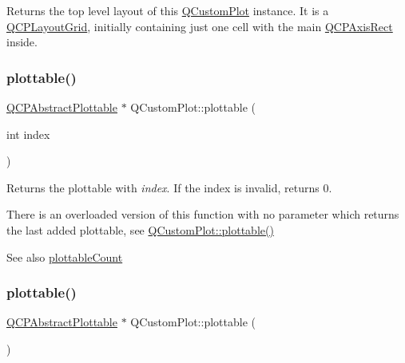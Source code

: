 Returns the top level layout of this \hyperlink{class_q_custom_plot}{Q\+Custom\+Plot} instance. It is a \hyperlink{class_q_c_p_layout_grid}{Q\+C\+P\+Layout\+Grid}, initially containing just one cell with the main \hyperlink{class_q_c_p_axis_rect}{Q\+C\+P\+Axis\+Rect} inside. \mbox{\label{class_q_custom_plot_a32de81ff53e263e785b83b52ecd99d6f}} 
\subsubsection{\texorpdfstring{plottable()}{plottable()}\hspace{0.1cm}{\footnotesize\ttfamily [1/2]}}
{\footnotesize\ttfamily \hyperlink{class_q_c_p_abstract_plottable}{Q\+C\+P\+Abstract\+Plottable} $\ast$ Q\+Custom\+Plot\+::plottable (\begin{DoxyParamCaption}\item[{int}]{index }\end{DoxyParamCaption})}

Returns the plottable with {\itshape index}. If the index is invalid, returns 0.

There is an overloaded version of this function with no parameter which returns the last added plottable, see \hyperlink{class_q_custom_plot_adea38bdc660da9412ba69fb939031567}{Q\+Custom\+Plot\+::plottable()}

\begin{DoxySeeAlso}{See also}
\hyperlink{class_q_custom_plot_a5f4f15991c14bf9ad659bb2a19dfbed4}{plottable\+Count} 
\end{DoxySeeAlso}
\mbox{\label{class_q_custom_plot_adea38bdc660da9412ba69fb939031567}} 
\subsubsection{\texorpdfstring{plottable()}{plottable()}\hspace{0.1cm}{\footnotesize\ttfamily [2/2]}}
{\footnotesize\ttfamily \hyperlink{class_q_c_p_abstract_plottable}{Q\+C\+P\+Abstract\+Plottable} $\ast$ Q\+Custom\+Plot\+::plottable (\begin{DoxyParamCaption}{ }\end{DoxyParamCaption})}

